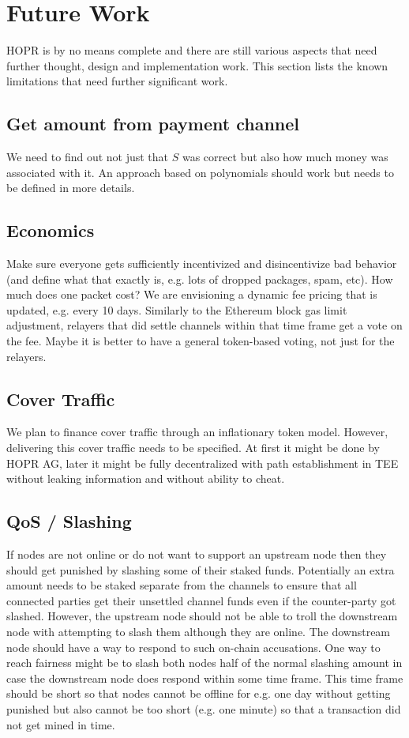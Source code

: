 \section{Future Work}
HOPR is by no means complete and there are still various aspects that need further thought, design and implementation work. This section lists the known limitations that need further significant work.

\subsection{Get amount from payment channel}
We need to find out not just that $S$ was correct but also how much money was associated with it. An approach based on polynomials should work but needs to be defined in more details. 

\subsection{Economics}
Make sure everyone gets sufficiently incentivized and disincentivize bad behavior (and define what that exactly is, e.g. lots of dropped packages, spam, etc). How much does one packet cost? We are envisioning a dynamic fee pricing that is updated, e.g. every 10 days. Similarly to the Ethereum block gas limit adjustment, relayers that did settle channels within that time frame get a vote on the fee. Maybe it is better to have a general token-based voting, not just for the relayers.

\subsection{Cover Traffic}
We plan to finance cover traffic through an inflationary token model. However, delivering this cover traffic needs to be specified. At first it might be done by HOPR AG, later it might be fully decentralized with path establishment in TEE without leaking information and without ability to cheat.

\subsection{QoS / Slashing}
If nodes are not online or do not want to support an upstream node then they should get punished by slashing some of their staked funds. Potentially an extra amount needs to be staked separate from the channels to ensure that all connected parties get their unsettled channel funds even if the counter-party got slashed. However, the upstream node should not be able to troll the downstream node with attempting to slash them although they are online. The downstream node should have a way to respond to such on-chain accusations. One way to reach fairness might be to slash both nodes half of the normal slashing amount in case the downstream node does respond within some time frame. This time frame should be short so that nodes cannot be offline for e.g. one day without getting punished but also cannot be too short (e.g. one minute) so that a transaction did not get mined in time.

